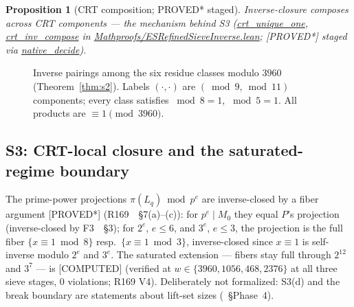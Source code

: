 \documentclass[11pt,a4paper]{article}
\newtheorem{proposition}{Proposition}
\theoremstyle{definition}
\begin{document}
\begin{proposition}[CRT composition; PROVED* staged]
  \label{prop:crtcomp}
  Inverse-closure composes across CRT components --- the mechanism
  behind S3 (\url{crt_unique_one}, \url{crt_inv_compose} in
  \url{Mathproofs/ESRefinedSieveInverse.lean}; [PROVED*] staged via
  \url{native_decide}).
\end{proposition}

\begin{figure}[t]
  \centering
  \caption{Inverse pairings among the six residue classes modulo $3960$
    (Theorem~\ref{thm:s2}). Labels $(\cdot,\cdot)$ are
    $(\bmod9,\bmod11)$ components; every class satisfies $\bmod8=1$,
    $\bmod5=1$. All products are $\equiv1\pmod{3960}$.}
  \label{fig:invpairs}
\end{figure}

\subsection{S3: CRT-local closure and the saturated-regime boundary}

The prime-power projections $\pi(L_q)\bmod p^e$ are inverse-closed by a
fiber argument [PROVED*] (R169~\cite{R169}~\S7(a)--(c)): for $p^e\mid M_0$
they equal $P$'s projection (inverse-closed by F3~\cite{R169}~\S3); for
$2^e$, $e\le6$, and $3^e$, $e\le3$, the projection is the full fiber
$\{x\equiv1\bmod8\}$ resp.\ $\{x\equiv1\bmod3\}$, inverse-closed since
$x\equiv1$ is self-inverse modulo $2^e$ and $3^e$. The saturated
extension --- fibers stay full through $2^{12}$ and $3^7$ ---
is [COMPUTED] (verified at $w\in\{3960,1056,468,2376\}$ at all three
sieve stages, 0 violations; R169 V4). Deliberately not formalized: S3(d)
and the break boundary are statements about lift-set sizes
(\cite{R186}~\S Phase~4).
\end{document}
